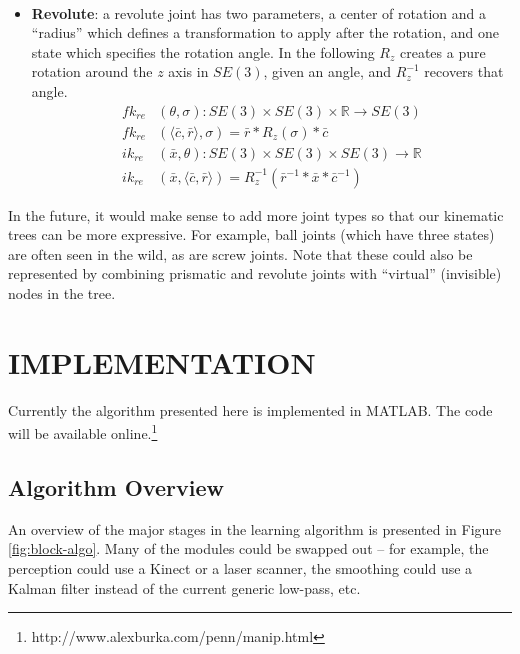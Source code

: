 \documentclass[letterpaper, 10 pt, conference]{ieeeconf}  %
\begin{document}
\begin{itemize}
\begin{align}
    \end{align}
  \item \textbf{Revolute}: a revolute joint has two parameters, a center of rotation and a ``radius'' which defines a transformation to apply after the rotation, and one state which specifies the rotation angle. In the following $R_z$ creates a pure rotation around the $z$ axis in $SE(3)$, given an angle, and $R_z^{-1}$ recovers that angle.
    \begin{align}
      fk_{re}&(\theta, \sigma) : SE(3) \times SE(3) \times \mathbb{R} \longrightarrow SE(3) \\
      fk_{re}&(\langle \bar{c}, \bar{r} \rangle, \sigma) = \bar{r} * R_z(\sigma) * \bar{c} \nonumber\\
      ik_{re}&(\bar{x}, \theta) : SE(3) \times SE(3) \times SE(3) \longrightarrow \mathbb{R} \\
      ik_{re}&(\bar{x}, \langle \bar{c}, \bar{r} \rangle) = R_z^{-1}(\bar{r}^{-1}*\bar{x}*\bar{c}^{-1}) \nonumber
    \end{align}
\end{itemize}

In the future, it would make sense to add more joint types so that our kinematic trees can be more expressive. For example, ball joints (which have three states) are often seen in the wild, as are screw joints. Note that these could also be represented by combining prismatic and revolute joints with ``virtual'' (invisible) nodes in the tree.

\section{IMPLEMENTATION} \label{sec:implementation}
Currently the algorithm presented here is implemented in MATLAB. The code will be available online.\footnote{http://www.alexburka.com/penn/manip.html}

\subsection{Algorithm Overview} \label{sec:algorithm}
An overview of the major stages in the learning algorithm is presented in Figure \ref{fig:block-algo}. Many of the modules could be swapped out -- for example, the perception could use a Kinect or a laser scanner, the smoothing could use a Kalman filter instead of the current generic low-pass, etc.
\end{document}
